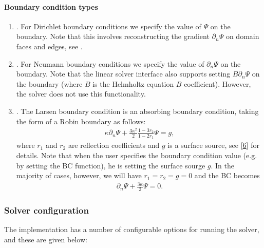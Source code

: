 \documentclass[letterpaper,10pt,english]{sphinxmanual}
\begin{document}
\paragraph{Boundary condition types}
\label{\detokenize{Solvers/RTE:boundary-condition-types}}\begin{enumerate}
%
\item {} 
.
For Dirichlet boundary conditions we specify the value of \(\Psi\) on the boundary.
Note that this involves reconstructing the gradient \(\partial_n\Psi\) on domain faces and edges, see .

\item {} 
.
For Neumann boundary conditions we specify the value of \(\partial_n\Psi\) on the boundary.
Note that the linear solver interface also supports setting \(B\partial_n\Psi\) on the boundary (where \(B\) is the Helmholtz equation \(B\) coefficient).
However, the  solver does not use this functionality.

\item {} 
.
The Larsen boundary condition is an absorbing boundary condition, taking the form of a Robin boundary as follows:
\begin{equation*}
\begin{split}\kappa\partial_n\Psi + \frac{3\kappa^2}{2}\frac{1-3r_2}{1-2r_1}\Psi = g,\end{split}
\end{equation*}
where \(r_1\) and \(r_2\) are reflection coefficients and \(g\) is a surface source, see {[}\hyperlink{cite.ZZReferences:id51}{6}{]} for details.
Note that when the user specifies the boundary condition value (e.g. by setting the BC function), he is setting the surface sourge \(g\).
In the majority of cases, however, we will have \(r_1 = r_2 = g = 0\) and the BC becomes
\begin{equation*}
\begin{split}\partial_n\Psi + \frac{3\kappa}{2}\Psi = 0.\end{split}
\end{equation*}
\end{enumerate}


\subsubsection{Solver configuration}
\label{\detokenize{Solvers/RTE:solver-configuration}}
The  implementation has a number of configurable options for running the solver, and these are given below:
\end{document}
